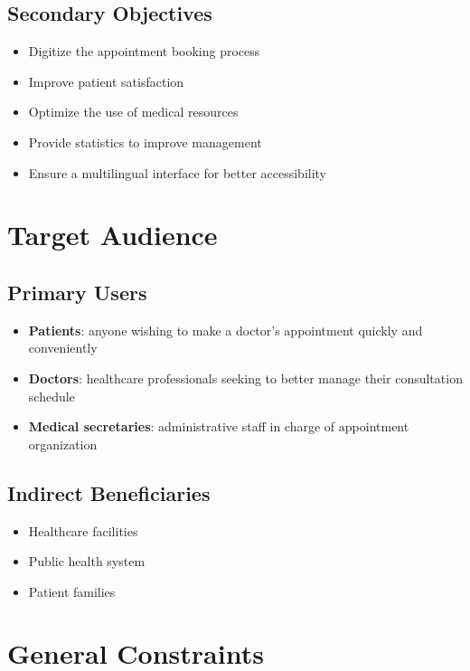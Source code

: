 \documentclass[12pt,a4paper]{report}
\begin{document}
\subsection{Secondary Objectives}
\begin{itemize}
    \item Digitize the appointment booking process
    \item Improve patient satisfaction
    \item Optimize the use of medical resources
    \item Provide statistics to improve management
    \item Ensure a multilingual interface for better accessibility
\end{itemize}

\section{Target Audience}

\subsection{Primary Users}
\begin{itemize}
    \item \textbf{Patients}: anyone wishing to make a doctor's appointment quickly and conveniently
    \item \textbf{Doctors}: healthcare professionals seeking to better manage their consultation schedule
    \item \textbf{Medical secretaries}: administrative staff in charge of appointment organization
\end{itemize}

\subsection{Indirect Beneficiaries}
\begin{itemize}
    \item Healthcare facilities
    \item Public health system
    \item Patient families
\end{itemize}

\section{General Constraints}
\end{document}
